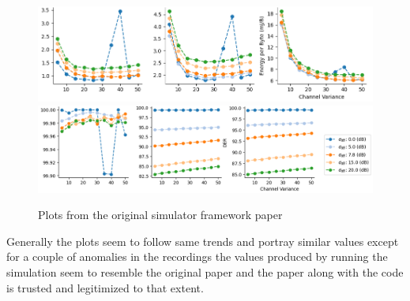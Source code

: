 \begin{figure}[H]
\centering
\includegraphics[scale=0.5]{figures/my_plots_1.PNG}\\
\hspace*{1.3cm}  
\includegraphics[scale=0.5]{figures/my_plots_2.PNG}
  \caption{Plots from the original simulator framework paper \cite{simulator}}
  \label{fig:my_sectors}
\end{figure}

Generally the plots seem to follow same trends and portray 
similar values except for a couple of anomalies in the
recordings the values produced by running the simulation
seem to resemble the original paper and the paper along with
the code is trusted and legitimized to that extent. 

